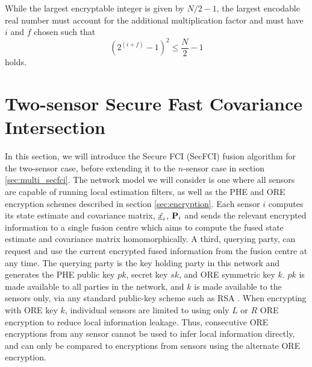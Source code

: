 \documentclass[letterpaper, 10 pt, conference]{ieeeconf}  %
\begin{document}
While the largest encryptable integer is given by $N/2-1$, the largest encodable real number must account for the additional multiplication factor and must have $i$ and $f$ chosen such that
\begin{equation}
   (2^{(i+f)}-1)^2 \leq \frac{N}{2}-1 \label{eqn:qmn_max}
\end{equation}
holds.





\section{Two-sensor Secure Fast Covariance Intersection} \label{sec:secfci}
In this section, we will introduce the Secure FCI (SecFCI) fusion algorithm for the two-sensor case, before extending it to the $n$-sensor case in section \ref{sec:multi_secfci}. The network model we will consider is one where all sensors are capable of running local estimation filters, as well as the PHE and ORE encryption schemes described in section \ref{sec:encryption}. Each sensor $i$ computes its state estimate and covariance matrix, $\hat{{\underline{x}}_i}$, ${{\mathbf{P}}}_i$ and sends the relevant encrypted information to a single fusion centre which aims to compute the fused state estimate and covariance matrix homomorphically. A third, querying party, can request and use the current encrypted fused information from the fusion centre at any time. The querying party is the key holding party in this network and generates the PHE public key $pk$, secret key $sk$, and ORE symmetric key $k$. $pk$ is made available to all parties in the network, and $k$ is made available to the sensors only, via any standard public-key scheme such as RSA \cite{rivestMethodObtainingDigital1978}. When encrypting with ORE key $k$, individual sensors are limited to using only $L$ or $R$ ORE encryption to reduce local information leakage. Thus, consecutive ORE encryptions from any sensor cannot be used to infer local information directly, and can only be compared to encryptions from sensors using the alternate ORE encryption.
\end{document}

